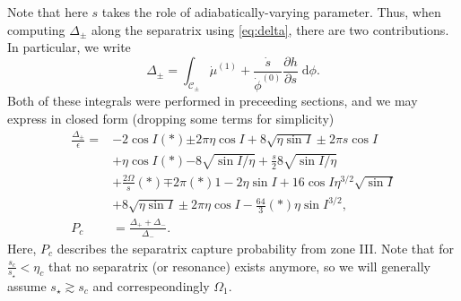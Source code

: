 \documentclass[
        fleqn,
        usenatbib,
    ]{mnras}
\newcommand*{\pd}[2]{\frac{\partial#1}{\partial#2}}
\newcommand*{\p}[1]{\left(#1\right)}
\begin{document}
Note that here $s$ takes the role of adiabatically-varying parameter. Thus, when
computing $\Delta_{\pm}$ along the separatrix using \autoref{eq:delta}, there
are two contributions. In particular, we write
\begin{equation}
    \Delta_{\pm} = \int_{\mathcal{C}_{\pm}} \dot{\mu}^{(1)} +
        \frac{\dot{s}}{\dot{\phi}^{(0)}} \pd{h}{s}
        \;\mathrm{d}\phi.
\end{equation}
Both of these integrals were performed in preceeding sections, and we may
express in closed form (dropping some terms for simplicity)
\begin{align}
    \frac{\Delta_{\pm}}{\epsilon} ={}&
        -2\cos I\p*{\pm 2\pi \eta \cos I + 8\sqrt{\eta \sin I}}
        \pm 2\pi s\cos I\nonumber\\
        &+ \eta \cos I \p*{-8\sqrt{\sin I / \eta}}
            + \frac{s}{2}8\sqrt{\sin I/\eta}\nonumber\\
        &+ \frac{2\Omega}{s}\p*{\mp 2\pi\p*{1 - 2\eta \sin I}
            + 16\cos I \eta^{3/2}\sqrt{\sin I}}\nonumber\\
        &+ 8\sqrt{\eta \sin I}
            \pm 2 \pi \eta \cos I
            - \frac{64}{3} \p*{\eta \sin I}^{3/2},\label{eq:delta_p4}\\
    P_{c} &= \frac{\Delta_+ + \Delta_-}{\Delta_-}. \label{eq:p_c_p4}
\end{align}
Here, $P_c$ describes the separatrix capture probability from zone III\@. Note
that for $\frac{s_c}{s_\star} < \eta_c$ that no separatrix (or resonance) exists
anymore, so we will generally assume $s_\star \gtrsim s_c$ and correspeondingly
$\Omega_1$.
\end{document}
